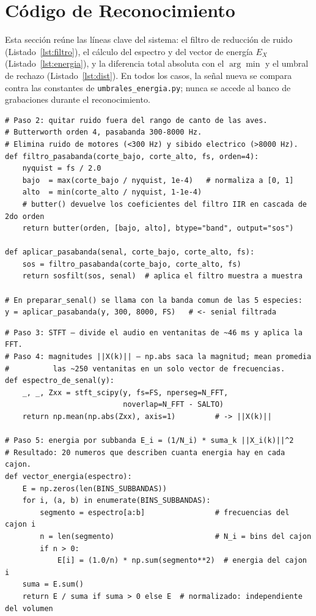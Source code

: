 \documentclass[conference]{IEEEtran}
\begin{document}
\section{Código de Reconocimiento}\label{sec:codigo}
Esta sección reúne las líneas clave del sistema: el filtro de reducción de ruido
(Listado~\ref{lst:filtro}), el cálculo del espectro y del vector de energía
$E_X$ (Listado~\ref{lst:energia}), y la diferencia total absoluta con el
$\arg\min$ y el umbral de rechazo (Listado~\ref{lst:dist}). En todos los casos,
la señal nueva se compara contra las constantes de \texttt{umbrales\_energia.py};
nunca se accede al banco de grabaciones durante el reconocimiento.

\begin{lstlisting}[caption={Filtro IIR Butterworth pasabanda 300--8000\,Hz (\texttt{preprocesamiento.py}).},label=lst:filtro]
# Paso 2: quitar ruido fuera del rango de canto de las aves.
# Butterworth orden 4, pasabanda 300-8000 Hz.
# Elimina ruido de motores (<300 Hz) y sibido electrico (>8000 Hz).
def filtro_pasabanda(corte_bajo, corte_alto, fs, orden=4):
    nyquist = fs / 2.0
    bajo  = max(corte_bajo / nyquist, 1e-4)   # normaliza a [0, 1]
    alto  = min(corte_alto / nyquist, 1-1e-4)
    # butter() devuelve los coeficientes del filtro IIR en cascada de 2do orden
    return butter(orden, [bajo, alto], btype="band", output="sos")

def aplicar_pasabanda(senal, corte_bajo, corte_alto, fs):
    sos = filtro_pasabanda(corte_bajo, corte_alto, fs)
    return sosfilt(sos, senal)  # aplica el filtro muestra a muestra

# En preparar_senal() se llama con la banda comun de las 5 especies:
y = aplicar_pasabanda(y, 300, 8000, FS)   # <- senial filtrada
\end{lstlisting}

\begin{lstlisting}[caption={STFT, magnitudes y vector de energía $E_X$ (\texttt{caracteristicas.py}).},label=lst:energia]
# Paso 3: STFT — divide el audio en ventanitas de ~46 ms y aplica la FFT.
# Paso 4: magnitudes ||X(k)|| — np.abs saca la magnitud; mean promedia
#          las ~250 ventanitas en un solo vector de frecuencias.
def espectro_de_senal(y):
    _, _, Zxx = stft_scipy(y, fs=FS, nperseg=N_FFT,
                           noverlap=N_FFT - SALTO)
    return np.mean(np.abs(Zxx), axis=1)         # -> ||X(k)||

# Paso 5: energia por subbanda E_i = (1/N_i) * suma_k ||X_i(k)||^2
# Resultado: 20 numeros que describen cuanta energia hay en cada cajon.
def vector_energia(espectro):
    E = np.zeros(len(BINS_SUBBANDAS))
    for i, (a, b) in enumerate(BINS_SUBBANDAS):
        segmento = espectro[a:b]                # frecuencias del cajon i
        n = len(segmento)                       # N_i = bins del cajon
        if n > 0:
            E[i] = (1.0/n) * np.sum(segmento**2)  # energia del cajon i
    suma = E.sum()
    return E / suma if suma > 0 else E  # normalizado: independiente del volumen
\end{lstlisting}
\end{document}
